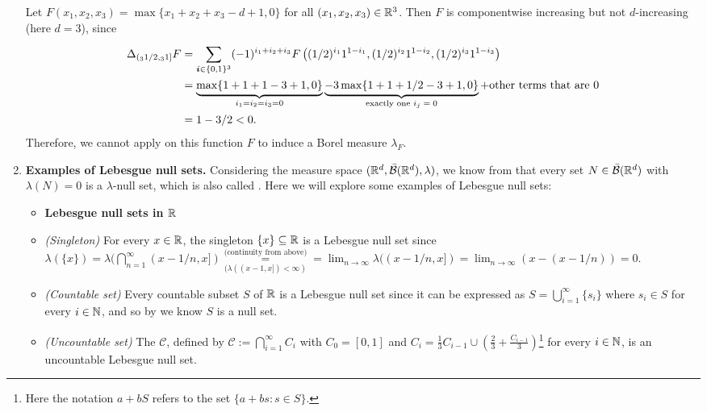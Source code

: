 \begin{enumerate}
Let \(F(x_1,x_2,x_3)=\max\{x_1+x_2+x_3-d+1,0\}\) for all \((x_1,x_2,x_3)\in\mathbb{R}^3\).
Then \(F\) is componentwise increasing but not \(d\)-increasing (here \(d=3\)),
since
\begin{align*}
\Delta_{({}_{3}1/2,{}_{3}1]}F&=\sum_{\bm{i}\in\{0,1\}^{3}}^{}(-1)^{i_1+i_2+i_3}
F\left((1/2)^{i_1}1^{1-i_1},(1/2)^{i_2}1^{1-i_2},(1/2)^{i_3}1^{1-i_3}\right) \\
&=\underbrace{\max\{1+1+1-3+1,0\}}_{i_1=i_2=i_3=0}
\underbrace{-3\max\{1+1+1/2-3+1,0\}}_{\text{exactly one \(i_j=0\)}}
+\text{other terms that are \(0\)} \\
&=1-3/2<0.
\end{align*}
Therefore, we cannot apply  on this function
\(F\) to induce a Borel measure \(\lambda_{F}\).
\item\label{it:lebesgue-null-sets-eg} \textbf{Examples of Lebesgue null sets.} Considering the measure space
\((\mathbb{R}^d,\bar{\mathcal{B}}(\mathbb{R}^d),\lambda)\), we know from
 that every set \(N\in\bar{\mathcal{B}}(\mathbb{R}^d)\) with
\(\lambda(N)=0\) is a \(\lambda\)-null set, which is also called . Here we will explore some examples of Lebesgue null sets:
\begin{itemize}
\item[] \textbf{Lebesgue null sets in \(\mathbb{R}\)}
\item \emph{(Singleton)} For every \(x\in\mathbb{R}\), the singleton \(\{x\}\subseteq
\mathbb{R}\) is a Lebesgue null set since \(\lambda(\{x\})
=\lambda(\bigcap_{n=1}^{\infty}(x-1/n,x])
\underset{(\lambda((x-1,x])<\infty)}{\overset{\text{(continuity from above)}}{=}}
=\lim_{n\to\infty}\lambda((x-1/n,x])
=\lim_{n\to\infty}(x-(x-1/n))
=0
\).
\item \emph{(Countable set)} Every countable subset \(S\) of \(\mathbb{R}\) is a
Lebesgue null set since it can be expressed as
\(S=\bigcup_{i=1}^{\infty}\{s_i\}\) where \(s_i\in S\) for every \(i\in\mathbb{N}\),
and so by  we know \(S\) is a null set.
\item \emph{(Uncountable set)} The  \(\mathcal{C}\), defined
by \(\mathcal{C}:=\bigcap_{i=1}^{\infty}C_i\) with \(C_0=[0,1]\) and
\(C_i=\frac{1}{3}C_{i-1}\cup\left(\frac{2}{3}+\frac{C_{i-1}}{3}\right)\)\footnote{
Here the notation \(a+bS\) refers to the set \(\{a+bs:s\in S\}\).} for every
\(i\in\mathbb{N}\), is an uncountable Lebesgue null set.
\begin{center}
\end{center}
\end{itemize}
\end{enumerate}
